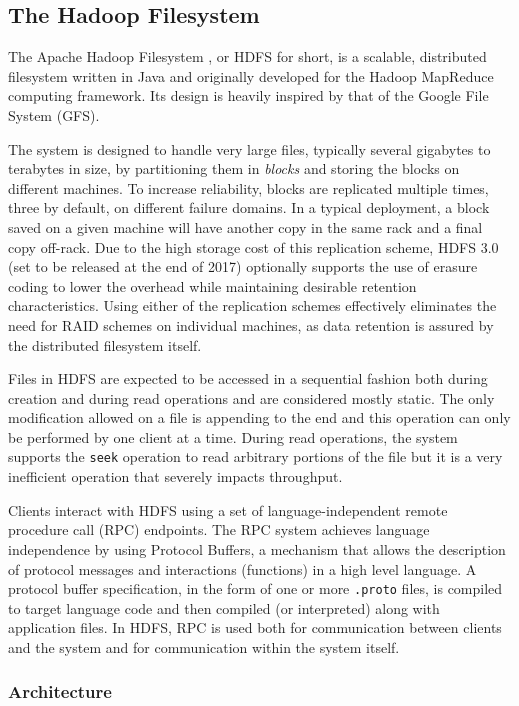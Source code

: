 \subsection{The Hadoop Filesystem}
The Apache Hadoop Filesystem \cite{DBLP:conf/mss/ShvachkoKRC10}, or HDFS for short, is a scalable, distributed filesystem written in Java and originally developed for the Hadoop MapReduce computing framework.
Its design is heavily inspired by that of the Google File System \cite{ghemawat2003google} (GFS).

The system is designed to handle very large files, typically several gigabytes to terabytes in size, by partitioning them in \emph{blocks} and storing the blocks on different machines.
To increase reliability, blocks are replicated multiple times, three by default, on different failure domains.
In a typical deployment, a block saved on a given machine will have another copy in the same rack and a final copy off-rack.
Due to the high storage cost of this replication scheme, HDFS 3.0 (set to be released at the end of 2017) optionally supports the use of erasure coding to lower the overhead while maintaining desirable retention characteristics.
Using either of the replication schemes effectively eliminates the need for RAID schemes on individual machines, as data retention is assured by the distributed filesystem itself.

Files in HDFS are expected to be accessed in a sequential fashion both during creation and during read operations and are considered mostly static.
The only modification allowed on a file is appending to the end and this operation can only be performed by one client at a time.
During read operations, the system supports the \texttt{seek} operation to read arbitrary portions of the file but it is a very inefficient operation that severely impacts throughput.

Clients interact with HDFS using a set of language-independent remote procedure call (RPC) endpoints.
The RPC system achieves language independence by using Protocol Buffers, a mechanism that allows the description of protocol messages and interactions (functions) in a high level language.
A protocol buffer specification, in the form of one or more \texttt{.proto} files, is compiled to target language code and then compiled (or interpreted) along with application files.
In HDFS, RPC is used both for communication between clients and the system and for communication within the system itself.

\subsubsection{Architecture}

